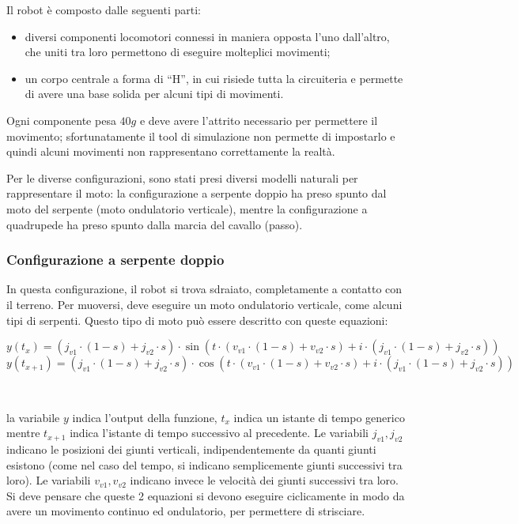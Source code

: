 \documentclass[11pt]{article} %
\begin{document}
Il robot è composto dalle seguenti parti:
\begin{itemize}
  \item diversi componenti locomotori connessi in maniera opposta l'uno dall'altro, che uniti tra loro permettono di eseguire molteplici movimenti;
  \item un corpo centrale a forma di ``H'', in cui risiede tutta la circuiteria e permette di avere una base solida per alcuni tipi di movimenti.
\end{itemize}

Ogni componente pesa $40g$ e deve avere l'attrito necessario per permettere il movimento; sfortunatamente il tool di simulazione non permette di impostarlo e quindi alcuni movimenti non rappresentano correttamente la realtà.

Per le diverse configurazioni, sono stati presi diversi modelli naturali per rappresentare il moto: la configurazione a serpente doppio ha preso spunto dal moto del serpente (moto ondulatorio verticale), mentre la configurazione a quadrupede ha preso spunto dalla marcia del cavallo (passo).

\subsubsection{Configurazione a serpente doppio}

In questa configurazione, il robot si trova sdraiato, completamente a contatto con il terreno. Per muoversi, deve eseguire un moto ondulatorio verticale, come alcuni tipi di serpenti. Questo tipo di moto può essere descritto con queste equazioni:

$$ y(t_{x}) = (j_{v1} \cdot (1-s)+j_{v2} \cdot s) \cdot \sin(t \cdot (v_{v1} \cdot (1-s)+v_{v2} \cdot s)+i \cdot (j_{v1} \cdot (1-s)+j_{v2} \cdot s)) $$
$$ y(t_{x+1}) = (j_{v1} \cdot (1-s)+j_{v2} \cdot s) \cdot \cos(t \cdot (v_{v1} \cdot (1-s)+v_{v2} \cdot s)+i \cdot (j_{v1} \cdot (1-s)+j_{v2} \cdot s)) $$

~

la variabile $ y $ indica l'output della funzione, $ t_{x} $ indica un istante di tempo generico mentre $ t_{x+1} $ indica l'istante di tempo successivo al precedente. Le variabili $ j_{v1}, j_{v2} $ indicano le posizioni dei giunti verticali, indipendentemente da quanti giunti esistono (come nel caso del tempo, si indicano semplicemente giunti successivi tra loro).  Le variabili $ v_{v1}, v_{v2} $ indicano invece le velocità dei giunti successivi tra loro.
Si deve pensare che queste 2 equazioni si devono eseguire ciclicamente in modo da avere un movimento continuo ed ondulatorio, per permettere di strisciare.
\end{document}
